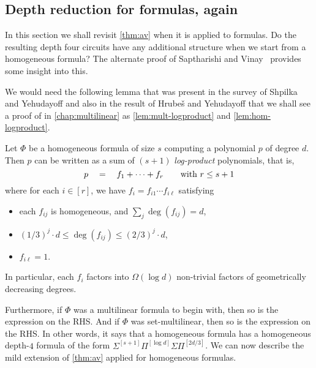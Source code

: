 \subsection{Depth reduction for formulas, again}

In this section we shall revisit \autoref{thm:av} when it is applied to formulas.
Do the resulting depth four circuits have any additional structure when we start from a homogeneous formula?
The alternate proof of Saptharishi and Vinay~\cite{saptharishivinay14} provides some insight into this. 

We would need the following lemma that was present in the survey of Shpilka and Yehudayoff \cite{sy} and also in the result of Hrube\v{s} and Yehudayoff \cite{HY11a} that we shall see a proof of in \autoref{chap:multilinear} as \autoref{lem:mult-logproduct} and \autoref{lem:hom-logproduct}.


\begin{lemma}\label{lem:hom-logproduct-restated}
  Let $\Phi$ be a homogeneous formula of size $s$ computing a polynomial $p$ of degree $d$.
Then $p$ can be written as a sum of $(s+1)$ \emph{log-product} polynomials, that is,
\begin{equation}\label{eqn:dred-formula-logproduct}
p \quad = \quad f_1 + \cdots + f_{r}\quad\quad \text{with $r \leq s+1$}
\end{equation}
where for each $i \in [r]$, we have $f_i = f_{i1} \cdots f_{i\ell}$ satisfying
\begin{itemize}
\item each $f_{ij}$ is homogeneous, and $\sum_j \deg(f_{ij}) = d$,
\item $(1 / 3)^j \cdot d \leq \deg(f_{ij}) \leq (2/ 3)^j \cdot d$,
\item $f_{i\ell} = 1$.
\end{itemize}
In particular, each $f_i$ factors into $\Omega(\log d)$ non-trivial factors of geometrically decreasing degrees. 
\end{lemma}

Furthermore, if $\Phi$ was a multilinear formula to begin with, then so is the expression on the RHS.
And if $\Phi$ was set-multilinear, then so is the expression on the RHS.
In other words, it says that a homogeneous formula has a homogeneous depth-$4$ formula of the form $\Sigma^{[s+1]}\Pi^{[\log d]}\Sigma\Pi^{[2d/3]}$.
We can now describe the mild extension of \autoref{thm:av} applied for homogeneous formulas. 

